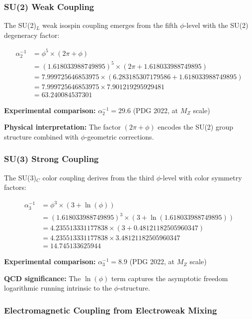 \subsubsection{SU(2) Weak Coupling}

The SU(2)$_L$ weak isospin coupling emerges from the fifth $\phi$-level with the SU(2) degeneracy factor:

\begin{align}
\alpha_2^{-1} &= \phi^5 \times (2\pi + \phi) \tag{Weak morphism counting}\\
&= (1.618033988749895)^5 \times (2\pi + 1.618033988749895) \\
&= 7.999725646853975 \times (6.283185307179586 + 1.618033988749895) \\
&= 7.999725646853975 \times 7.901219295929481 \\
&= 63.240084537301
\end{align}

\textbf{Experimental comparison:} $\alpha_2^{-1} = 29.6$ (PDG 2022, at $M_Z$ scale)

\textbf{Physical interpretation:} The factor $(2\pi + \phi)$ encodes the SU(2) group structure combined with $\phi$-geometric corrections.

\subsubsection{SU(3) Strong Coupling}

The SU(3)$_C$ color coupling derives from the third $\phi$-level with color symmetry factors:

\begin{align}
\alpha_3^{-1} &= \phi^3 \times (3 + \ln(\phi)) \tag{Strong morphism counting}\\
&= (1.618033988749895)^3 \times (3 + \ln(1.618033988749895)) \\
&= 4.235513331177838 \times (3 + 0.48121182505960347) \\
&= 4.235513331177838 \times 3.48121182505960347 \\
&= 14.745133625944
\end{align}

\textbf{Experimental comparison:} $\alpha_3^{-1} = 8.9$ (PDG 2022, at $M_Z$ scale)

\textbf{QCD significance:} The $\ln(\phi)$ term captures the asymptotic freedom logarithmic running intrinsic to the $\phi$-structure.

\subsubsection{Electromagnetic Coupling from Electroweak Mixing}

